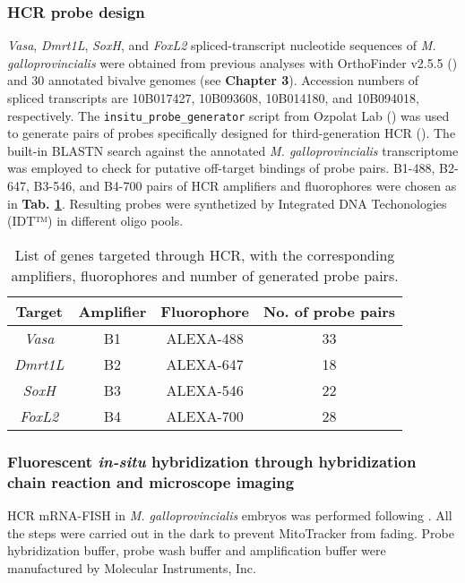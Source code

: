 \subsubsection{HCR probe design} \label{probedesign_MM}
\textit{Vasa}, \textit{Dmrt1L}, \textit{SoxH}, and \textit{FoxL2} spliced-transcript nucleotide sequences of \textit{M. galloprovincialis} were obtained from previous analyses with OrthoFinder v2.5.5 (\textbf{\cite{emms2019orthofinder}}) and 30 annotated bivalve genomes (see \textbf{Chapter 3}). Accession numbers of spliced transcripts are 10B017427, 10B093608, 10B014180, and 10B094018, respectively. The \verb|insitu_probe_generator| script from Ozpolat Lab (\textbf{\cite{kuehn2022probegenerator}}) was used to generate pairs of probes specifically designed for third-generation HCR (\textbf{\cite{choi2018hcr3}}). The built-in BLASTN search against the annotated \textit{M. galloprovincialis} transcriptome was employed to check for putative off-target bindings of probe pairs. B1-488, B2-647, B3-546, and B4-700 pairs of HCR amplifiers and fluorophores were chosen as in \textbf{Tab. \ref{tab:probes}}. Resulting probes were synthetized by Integrated DNA Techonologies (IDT™) in different oligo pools.

\begin{table}
	\centering
	\begin{tabular}{@{}cccc@{}}
		\toprule
		\textbf{Target} & \textbf{Amplifier} & \textbf{Fluorophore} & \textbf{No. of probe pairs} \\
		\midrule \midrule
		\textit{Vasa}   & B1                 & ALEXA-488            & 33                          \\
		\textit{Dmrt1L} & B2                 & ALEXA-647            & 18                          \\
		\textit{SoxH}   & B3                 & ALEXA-546            & 22                          \\
		\textit{FoxL2}  & B4                 & ALEXA-700            & 28                          \\
		\bottomrule
	\end{tabular}
	\caption{List of genes targeted through HCR, with the corresponding amplifiers, fluorophores and number of generated probe pairs.}
	\label{tab:probes}
\end{table}

\subsubsection{Fluorescent \textit{in-situ} hybridization through hybridization chain reaction and microscope imaging} \label{chapter4_MM_hcrprotocol}
HCR mRNA-FISH in \textit{M. galloprovincialis} embryos was performed following \textbf{\cite{miglioli2024hcrMytilus}}. All the steps were carried out in the dark to prevent MitoTracker from fading. Probe hybridization buffer, probe wash buffer and amplification buffer were manufactured by Molecular Instruments, Inc.

